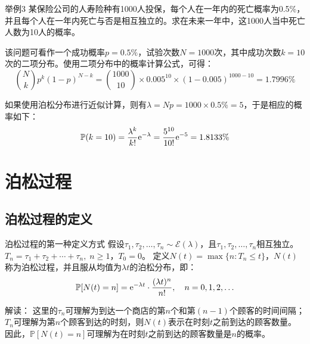 \documentclass[t]{beamer}
\renewcommand{\Pr}{\mathbb{P}}
\begin{document}
\begin{frame}{举例3}\small
    某保险公司的人寿险种有1000人投保，每个人在一年内的死亡概率为0.5\%，并且每个人在一年内死亡与否是相互独立的。求在未来一年中，这1000人当中死亡人数为10人的概率。
    
    \begin{block}{}
        该问题可看作一个成功概率$p=0.5\%$，试验次数$N=1000$次，其中成功次数$k=10$次的二项分布。使用二项分布中的概率计算公式，可得：
\[{N\choose k}p^k(1-p)^{N-k}={1000\choose 10}\times 0.005^{10}\times (1-0.005)^{1000-10}=1.7996\% \]

如果使用泊松分布进行近似计算，则有$\lambda=Np=1000\times 0.5\%=5$，于是相应的概率如下：
\[\Pr(k=10)=\frac{\lambda^k}{k!}{\rm e}^{-\lambda}=\frac{5^{10}}{10!}{\rm e}^{-5}=1.8133\% \]
    \end{block}
\end{frame}

\section{泊松过程}

\subsection{泊松过程的定义}
\begin{frame}{泊松过程的第一种定义方式}
    假设$\tau_1,\tau_2,\ldots,\tau_n\sim \mathcal{E}(\lambda)$，且$\tau_1,\tau_2,\ldots,\tau_n$相互独立。
$T_n=\tau_1+\tau_2+\cdots+\tau_n,\; n\ge 1$，$T_0=0$。
定义$N(t)=\max\{n:T_n\le t\}$，$N(t)$称为泊松过程，并且服从均值为$\lambda t$的泊松分布，即：
\begin{equation*}
\Pr[N(t)=n]={\rm e}^{-\lambda t}\cdot\frac{(\lambda t)^n}{n!}, \quad n=0,1,2,\ldots 	
\end{equation*}

\begin{block}{解读：}
    这里的$\tau_n$可理解为到达一个商店的第$n$个和第$(n-1)$个顾客的{时间间隔}；$T_n$可理解为第$n$个顾客到达的{时刻}，则$N(t)$表示在时刻$t$之前到达的{顾客数量}。
因此，$\Pr[N(t)=n]$可理解为在时刻$t$之前到达的顾客数量是$n$的概率。
\end{block}
\end{frame}
\end{document}
